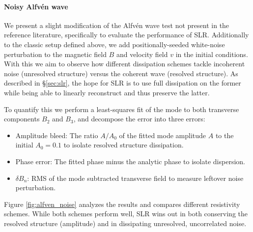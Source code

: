 \paragraph{Noisy Alfvén wave}
We present a slight modification of the Alfvén wave test not present in the reference literature, specifically to evaluate the performance of SLR. Additionally to the classic setup defined above, we add positionally-seeded white-noise perturbation to the magnetic field $B$ and velocity field $v$ in the initial conditions. With this we aim to observe how different dissipation schemes tackle incoherent noise (unresolved structure) versus the coherent wave (resolved structure). As described in §\ref{sec:slr}, the hope for SLR is to use full dissipation on the former while being able to linearly reconstruct and thus preserve the latter. 

To quantify this we perform a least-squares fit of the mode to both transverse components $B_2$ and $B_3$, and decompose the error into three errors: 
\begin{samepage}
\begin{itemize}
    \item Amplitude bleed: The ratio $A/A_0$ of the fitted mode amplitude $A$ to the initial $A_0=0.1$ to isolate resolved structure dissipation. 
    \item Phase error: The fitted phase minus the analytic phase to isolate dispersion. 
    \item $\delta B_n$: RMS of the mode subtracted transverse field to measure leftover noise perturbation.
\end{itemize}
\end{samepage}

Figure \ref{fig:alfven_noise} analyzes the results and compares different resistivity schemes. While both schemes perform well, SLR wins out in both conserving the resolved structure (amplitude) and in dissipating unresolved, uncorrelated noise. 


